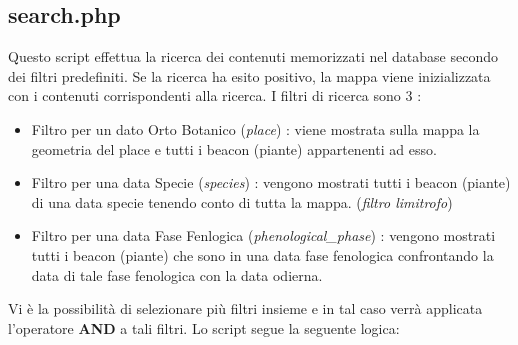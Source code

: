 \subsection{search.php}
Questo script effettua la ricerca dei contenuti memorizzati nel database secondo dei filtri predefiniti. \newline
Se la ricerca ha esito positivo, la mappa viene inizializzata con i contenuti corrispondenti alla ricerca.
I filtri di ricerca sono 3 : 
\begin{itemize}
\item Filtro per un dato Orto Botanico (\textit{place}) : viene mostrata sulla mappa la geometria del place e tutti i beacon (piante) appartenenti ad esso.
\item Filtro per una data Specie (\textit{species}) : vengono mostrati tutti i beacon (piante) di una data specie tenendo conto di tutta la mappa. (\textit{filtro limitrofo})
\item Filtro per una data Fase Fenlogica (\textit{phenological\_phase}) : vengono mostrati tutti i beacon (piante) che sono in una data fase fenologica confrontando la data di tale fase fenologica con la data odierna.
\end{itemize}
Vi è la possibilità di selezionare più filtri insieme e in tal caso verrà applicata l'operatore \textbf{AND} a tali filtri.
\newline
Lo script segue la seguente logica:
